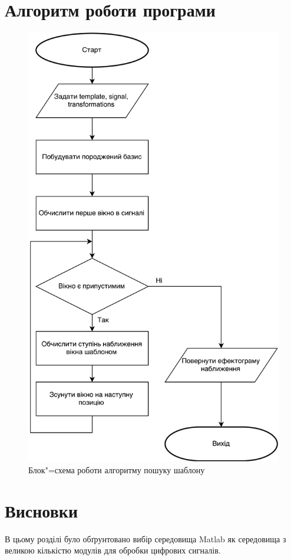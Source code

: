 \section{Алгоритм роботи програми}
    \begin{figure}[!h]
        \centering
        \includegraphics[height=0.82\textheight]{Drawing2.eps}
        \caption{Блок"=схема роботи алгоритму пошуку шаблону}
        \label{fig:block_scheme_monitor}
    \end{figure}

\section{Висновки}
    В цьому розділі було обґрунтовано вибір середовища Matlab як середовища з великою кількістю модулів для обробки
    цифрових сигналів.


